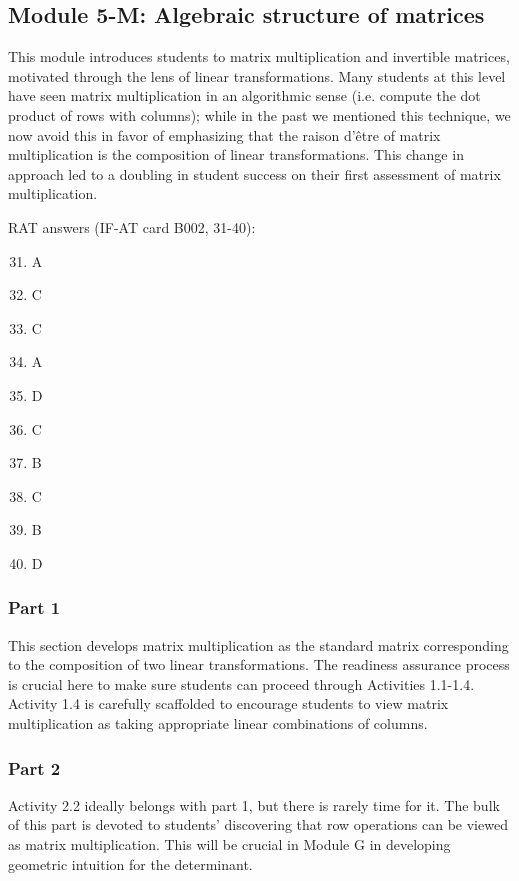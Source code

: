 \documentclass{article}
\begin{document}
\subsection*{Module 5-M: Algebraic structure of matrices}
This module introduces students to matrix multiplication and invertible matrices, motivated through the lens of linear transformations.  Many students at this level have seen matrix multiplication in an algorithmic sense (i.e. compute the dot product of rows with columns); while in the past we mentioned this technique, we now avoid this in favor of emphasizing that the raison d'\^{e}tre of matrix multiplication is the composition of linear transformations.  This change in approach led to a doubling in student success on their first assessment of matrix multiplication.


RAT answers (IF-AT card B002, 31-40):
\begin{multicols}{10}
\begin{enumerate}[1)]
\setcounter{enumi}{30}
\item A
\item C
\item C
\item A
\item D
\item C
\item B
\item C
\item B
\item D
\end{enumerate}
\end{multicols}


\subsubsection*{Part 1}
This section develops matrix multiplication as the standard matrix corresponding to the composition of two linear transformations.  The readiness assurance process is crucial here to make sure students can proceed through Activities 1.1-1.4.  Activity 1.4 is carefully  scaffolded to encourage students to view matrix multiplication as taking appropriate linear combinations of columns. 

\subsubsection*{Part 2}
Activity 2.2 ideally belongs with part 1, but there is rarely time for it.  The bulk of this part is devoted to students' discovering that row operations can be viewed as matrix multiplication.  This will be crucial in Module G in developing geometric intuition for the determinant.  
\end{document}
